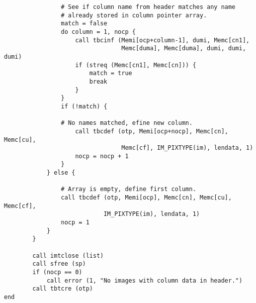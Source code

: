 \begin{verbatim}
                # See if column name from header matches any name
                # already stored in column pointer array.
                match = false
                do column = 1, nocp {
                    call tbcinf (Memi[ocp+column-1], dumi, Memc[cn1], 
                                 Memc[duma], Memc[duma], dumi, dumi, dumi)
                    if (streq (Memc[cn1], Memc[cn])) {
                        match = true
                        break
                    }
                }
                if (!match) {

                # No names matched, efine new column.
                    call tbcdef (otp, Memi[ocp+nocp], Memc[cn], Memc[cu], 
                                 Memc[cf], IM_PIXTYPE(im), lendata, 1)
                    nocp = nocp + 1
                }
            } else {

                # Array is empty, define first column.
                call tbcdef (otp, Memi[ocp], Memc[cn], Memc[cu], Memc[cf], 
                            IM_PIXTYPE(im), lendata, 1)
                nocp = 1
            }
        }

        call imtclose (list)
        call sfree (sp)
        if (nocp == 0)
            call error (1, "No images with column data in header.")
        call tbtcre (otp)
end
\end{verbatim}
\newpage
{}
